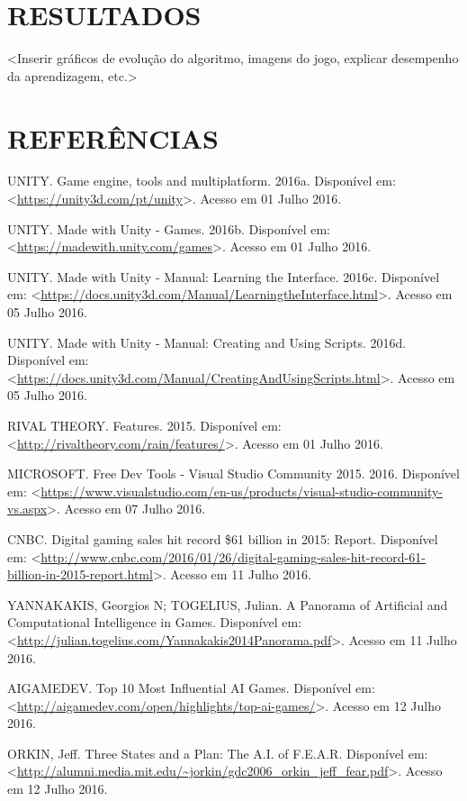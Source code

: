 \documentclass[12pt,a4paper]{article}
\begin{document}

\newpage %
\section{RESULTADOS}
	<Inserir gráficos de evolução do algoritmo, imagens do jogo, explicar desempenho da aprendizagem, etc.>

\newpage %
\section*{REFERÊNCIAS}
	\singlespace
	UNITY. Game engine, tools and multiplatform. 2016a. Disponível em: \textless \url{https://unity3d.com/pt/unity}\textgreater. Acesso em 01 Julho 2016.\par
	UNITY. Made with Unity - Games. 2016b. Disponível em: \textless \url{https://madewith.unity.com/games}\textgreater. Acesso em 01 Julho 2016.\par
	UNITY. Made with Unity - Manual: Learning the Interface. 2016c. Disponível em: \textless \url{https://docs.unity3d.com/Manual/LearningtheInterface.html}\textgreater. Acesso em 05 Julho 2016.\par
	UNITY. Made with Unity - Manual: Creating and Using Scripts. 2016d. Disponível em: \textless \url{https://docs.unity3d.com/Manual/CreatingAndUsingScripts.html}\textgreater. Acesso em 05 Julho 2016.\par
	RIVAL THEORY. Features. 2015. Disponível em: \textless \url{http://rivaltheory.com/rain/features/}\textgreater. Acesso em 01 Julho 2016.\par
	MICROSOFT. Free Dev Tools - Visual Studio Community 2015. 2016. Disponível em: \textless \url{https://www.visualstudio.com/en-us/products/visual-studio-community-vs.aspx}\textgreater. Acesso em 07 Julho 2016.\par
	CNBC. Digital gaming sales hit record \$61 billion in 2015: Report. Disponível em: \textless \url{http://www.cnbc.com/2016/01/26/digital-gaming-sales-hit-record-61-billion-in-2015-report.html}\textgreater. Acesso em 11 Julho 2016.\par
	YANNAKAKIS, Georgios N; TOGELIUS, Julian. A Panorama of Artificial and Computational Intelligence in Games. Disponível em: \textless \url{http://julian.togelius.com/Yannakakis2014Panorama.pdf}\textgreater. Acesso em 11 Julho 2016.\par
	AIGAMEDEV. Top 10 Most Influential AI Games. Disponível em: \textless \url{http://aigamedev.com/open/highlights/top-ai-games/}\textgreater. Acesso em 12 Julho 2016.\par
	ORKIN, Jeff. Three States and a Plan: The A.I. of F.E.A.R. Disponível em: \textless \url{http://alumni.media.mit.edu/~jorkin/gdc2006_orkin_jeff_fear.pdf}\textgreater. Acesso em 12 Julho 2016.\par
\end{document}
